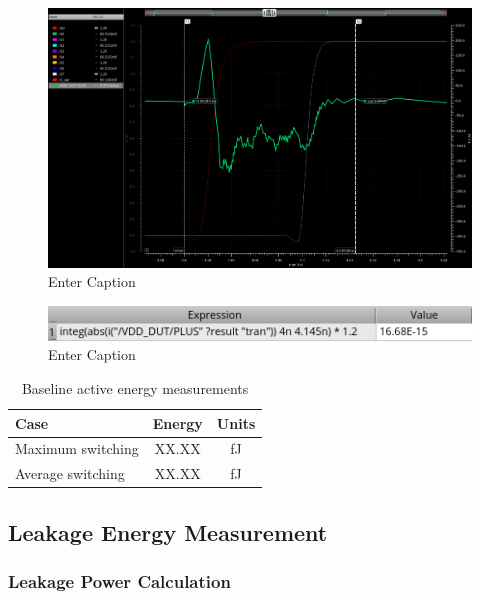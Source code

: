 \documentclass[12pt,letterpaper]{article}
\begin{document}
\begin{figure}[H]
    \centering
    \includegraphics[width=\linewidth]{writeup//figures//baseline//active_energy/avg_switching_energy_current.png}
    \caption{Enter Caption}
\end{figure}

\begin{figure}[H]
    \centering
    \includegraphics[width=0.5\linewidth]{writeup//figures//baseline//active_energy/abg_switching_energy_value.png}
    \caption{Enter Caption}
\end{figure}

\begin{table}[H]
\centering
\caption{Baseline active energy measurements}
\label{tab:baseline_active_energy}
\begin{tabular}{@{}lcc@{}}
\toprule
\textbf{Case} & \textbf{Energy} & \textbf{Units} \\
\midrule
Maximum switching & XX.XX & fJ \\
Average switching & XX.XX & fJ \\
\bottomrule
\end{tabular}
\end{table}

\subsection{Leakage Energy Measurement}

\subsubsection{Leakage Power Calculation}
\end{document}

